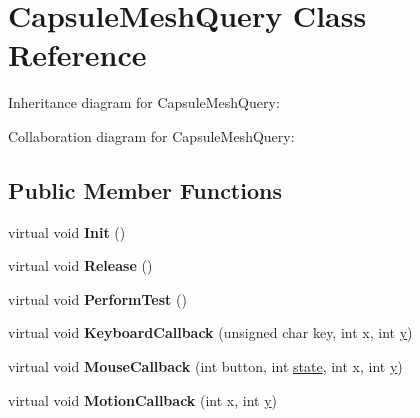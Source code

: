\hypertarget{class_capsule_mesh_query}{\section{Capsule\+Mesh\+Query Class Reference}
\label{class_capsule_mesh_query}
}


Inheritance diagram for Capsule\+Mesh\+Query\+:


Collaboration diagram for Capsule\+Mesh\+Query\+:
\subsection*{Public Member Functions}
\begin{DoxyCompactItemize}
\item 
\hypertarget{class_capsule_mesh_query_af310caae621eda1ce2fd1b5b93bc8f6f}{virtual void {\bfseries Init} ()}\label{class_capsule_mesh_query_af310caae621eda1ce2fd1b5b93bc8f6f}

\item 
\hypertarget{class_capsule_mesh_query_adb1dd4a961d823aee9f4f06fe86264ad}{virtual void {\bfseries Release} ()}\label{class_capsule_mesh_query_adb1dd4a961d823aee9f4f06fe86264ad}

\item 
\hypertarget{class_capsule_mesh_query_a8c708cc9e62f3afde8eafc5fcd60180a}{virtual void {\bfseries Perform\+Test} ()}\label{class_capsule_mesh_query_a8c708cc9e62f3afde8eafc5fcd60180a}

\item 
\hypertarget{class_capsule_mesh_query_ae0a3b96ac8c5f32c87a0d52147c3e992}{virtual void {\bfseries Keyboard\+Callback} (unsigned char key, int x, int \hyperlink{_ice_utils_8h_aa7ffaed69623192258fb8679569ff9ba}{y})}\label{class_capsule_mesh_query_ae0a3b96ac8c5f32c87a0d52147c3e992}

\item 
\hypertarget{class_capsule_mesh_query_acbd99088d6f78aaa25762350543a2dae}{virtual void {\bfseries Mouse\+Callback} (int button, int \hyperlink{structstate}{state}, int x, int \hyperlink{_ice_utils_8h_aa7ffaed69623192258fb8679569ff9ba}{y})}\label{class_capsule_mesh_query_acbd99088d6f78aaa25762350543a2dae}

\item 
\hypertarget{class_capsule_mesh_query_ae36b11932c0b91758af44f4e278c9c16}{virtual void {\bfseries Motion\+Callback} (int x, int \hyperlink{_ice_utils_8h_aa7ffaed69623192258fb8679569ff9ba}{y})}\label{class_capsule_mesh_query_ae36b11932c0b91758af44f4e278c9c16}

\end{DoxyCompactItemize}
